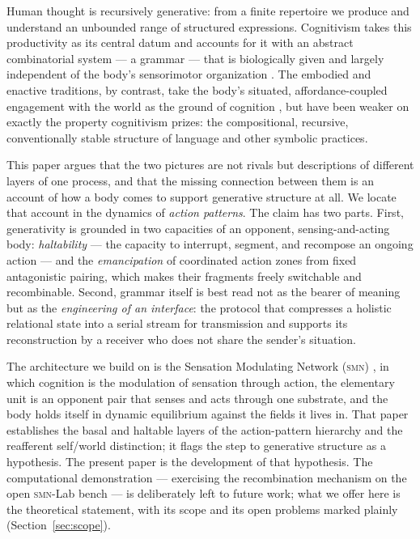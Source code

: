 \documentclass{article}
\newcommand{\smn}{\textsc{smn}}
\begin{document}
Human thought is recursively generative: from a finite repertoire we produce and understand an unbounded range of structured expressions. Cognitivism takes this productivity as its central datum and accounts for it with an abstract combinatorial system --- a grammar --- that is biologically given and largely independent of the body's sensorimotor organization \citep{chomsky1957syntactic}. The embodied and enactive traditions, by contrast, take the body's situated, affordance-coupled engagement with the world as the ground of cognition \citep{varela1991embodied,Noe2004ActionVision,OReganNoe2001Sensorimotor}, but have been weaker on exactly the property cognitivism prizes: the compositional, recursive, conventionally stable structure of language and other symbolic practices.

This paper argues that the two pictures are not rivals but descriptions of different layers of one process, and that the missing connection between them is an account of how a body comes to support generative structure at all. We locate that account in the dynamics of \emph{action patterns}. The claim has two parts. First, generativity is grounded in two capacities of an opponent, sensing-and-acting body: \emph{haltability} --- the capacity to interrupt, segment, and recompose an ongoing action --- and the \emph{emancipation} of coordinated action zones from fixed antagonistic pairing, which makes their fragments freely switchable and recombinable. Second, grammar itself is best read not as the bearer of meaning but as the \emph{engineering of an interface}: the protocol that compresses a holistic relational state into a serial stream for transmission and supports its reconstruction by a receiver who does not share the sender's situation.

The architecture we build on is the Sensation Modulating Network (\smn) \citep{NagarjunaKarnam2026SMN}, in which cognition is the modulation of sensation through action, the elementary unit is an opponent pair that senses and acts through one substrate, and the body holds itself in dynamic equilibrium against the fields it lives in. That paper establishes the basal and haltable layers of the action-pattern hierarchy and the reafferent self/world distinction; it flags the step to generative structure as a hypothesis. The present paper is the development of that hypothesis. The computational demonstration --- exercising the recombination mechanism on the open \smn-Lab bench --- is deliberately left to future work; what we offer here is the theoretical statement, with its scope and its open problems marked plainly (Section~\ref{sec:scope}).
\end{document}
